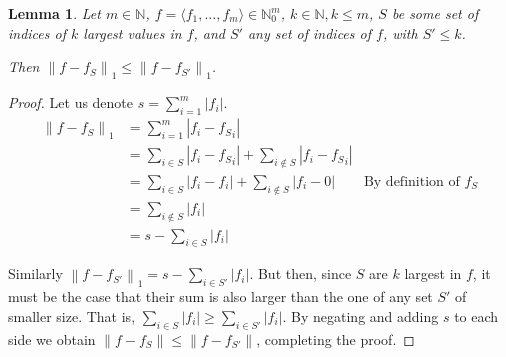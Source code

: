 \documentclass[11pt]{amsart}
\newtheorem{lemma}[theorem]{Lemma}
\newcommand{\norm}[1]{\left\lVert #1 \right\rVert}
\begin{document}
\begin{lemma}\label{lemS2}
Let $m \in \mathbb{N}$, $f = \langle f_1, \dots, f_m \rangle \in \mathbb{N}_0^m$, $k \in \mathbb{N}, k \le m$, $S$ be some set of indices of $k$ largest values in $f$, and $S'$ any set of indices of $f$, with $S' \le k$. 

Then $\norm{f - f_S}_1 \le \norm{f - f_{S'}}_1$.
\end{lemma}

\begin{proof}
Let us denote $s = \sum_{i = 1}^m |f_i|$.
\begin{align*}
\norm{f - f_S}_1 &= \sum_{i = 1}^m |f_i - {f_S}_i|\\
                 &= \sum_{i \in S} |f_i - {f_S}_i| + \sum_{i \not\in S} |f_i - {f_S}_i|\\
                 &= \sum_{i \in S} |f_i - f_i| + \sum_{i \not\in S} |f_i - 0| & \text{By definition of }f_S\\
                 &= \sum_{i \not\in S} |f_i|\\
                 &= s - \sum_{i \in S} |f_i| 
\end{align*}

Similarly $\norm{f - f_{S'}}_1 = s - \sum_{i \in S'} |f_i|$. But then, since $S$ are $k$ largest in $f$, it must be the case that their sum is also larger than the one of any set $S'$ of smaller size. That is, $\sum_{i \in S} |f_i| \ge \sum_{i \in S'} |f_i|$. By negating and adding $s$ to each side we obtain $\norm{f - f_S} \le \norm{f - f_{S'}}$, completing the proof.
\end{proof}
\end{document}
